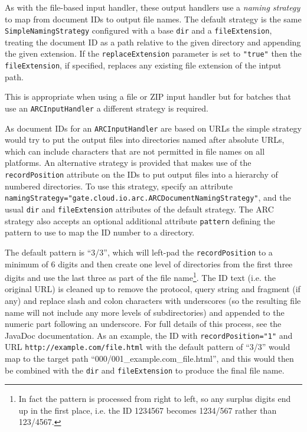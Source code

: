 As with the file-based input handler, these output handlers use a {\em naming
strategy} to map from document IDs to output file names.  The default strategy
is the same \verb!SimpleNamingStrategy! configured with a base \verb!dir! and a
\verb!fileExtension!, treating the document ID as a path relative to the given
directory and appending the given extension. If the \verb!replaceExtension! parameter
is set to \verb!"true"! then the \verb!fileExtension!, if specified, replaces
any existing file extension of the intput path.

This is appropriate when using a
file or ZIP input handler but for batches that use an \verb!ARCInputHandler! a
different strategy is required.

As document IDs for an \verb!ARCInputHandler! are based on URLs the simple
strategy would try to put the output files into directories named after
absolute URLs, which can include characters that are not permitted in file
names on all platforms.  An alternative strategy is provided that makes use of
the \verb!recordPosition! attribute on the IDs to put output files into a
hierarchy of numbered directories.  To use this strategy, specify an attribute
\verb!namingStrategy="gate.cloud.io.arc.ARCDocumentNamingStrategy"!, and the
usual \verb!dir! and \verb!fileExtension! attributes of the default strategy.
The ARC strategy also accepts an optional additional attribute \verb!pattern!
defining the pattern to use to map the ID number to a directory.

The default pattern is ``3/3'', which will left-pad the \verb!recordPosition!
to a minimum of 6 digits and then create one level of directories from the
first three digits and use the last three as part of the file name\footnote{In
fact the pattern is processed from right to left, so any surplus digits end up
in the first place, i.e. the ID 1234567 becomes 1234/567 rather than
123/4567.}.  The ID text (i.e. the original URL) is cleaned up to remove the
protocol, query string and fragment (if any) and replace slash and colon
characters with underscores (so the resulting file name will not include any
more levels of subdirectories) and appended to the numeric part following an
underscore.  For full details of this process, see the JavaDoc
documentation.  As an example, the ID with \verb!recordPosition="1"! and URL
\verb!http://example.com/file.html! with the default pattern of ``3/3'' would
map to the target path ``000/001\_example.com\_file.html'', and this
would then be combined with the \verb!dir! and \verb!fileExtension! to produce
the final file name.


